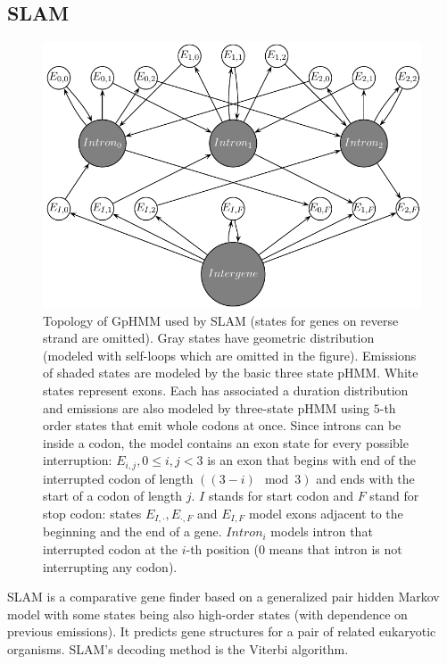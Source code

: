 \subsection{SLAM} 

\begin{figure}
\begin{center}
\includegraphics{../figures/slam.pdf}
\end{center}
\caption[HMM topology of SLAM's GpHMM]{
Topology of GpHMM used by SLAM (states for genes on reverse strand are omitted).
Gray states have geometric distribution (modeled with self-loops which are
omitted in the figure). Emissions of shaded states are modeled by the basic
three state pHMM. White states represent exons. Each has associated a duration
distribution and emissions are also modeled by three-state pHMM using $5$-th
order states that emit whole codons at once.  Since introns can be inside a
codon, the model contains an exon state for every possible interruption:
$E_{i,j},0\leq i,j<3$ is an exon that begins with end of the interrupted codon of
length $((3-i)\mod 3)$ and ends with the start of a codon of length $j$. $I$
stands for start codon and $F$ stand for stop codon: states
$E_{I,\cdot},E_{\cdot,F}$ and $E_{I,F}$ model exons adjacent to the beginning
and the end of a gene.  $Intron_i$ models intron that interrupted codon at the
$i$-th position ($0$ means that intron is not interrupting any codon).
}\label{FIGURE:SLAM} \end{figure}

SLAM \cite{SLAM2003}  is a comparative gene finder based on a generalized pair
hidden Markov model \cite{Alexanderson2004} with some states being also
high-order states (with dependence on previous emissions).  It predicts gene
structures for a pair of related eukaryotic organisms. SLAM's decoding method is
the Viterbi algorithm. 

